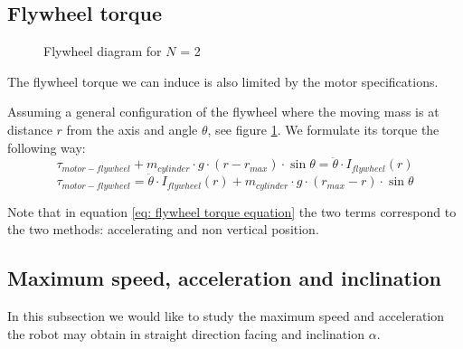 \subsection{Flywheel torque}
\begin{figure}
	\centering
            \caption{Flywheel diagram for $N$ = 2}
	\label{fig:Flywheel force diagram}
\end{figure}

The flywheel torque we can induce is also limited by the motor specifications. 

Assuming a general configuration of the flywheel where the moving mass is at distance $r$ from the axis and angle $\theta$, see figure \ref{fig:Flywheel force diagram}. We formulate its torque the following way:
\[
    \tau_{motor-flywheel} + m_{cylinder} \cdot g \cdot (r - r_{max}) \cdot \sin{\theta} = \ddot{\theta}\cdot I_{flywheel}(r)  
\]
\begin{equation}\label{eq: flywheel torque equation}    
    \tau_{motor-flywheel} = \ddot{\theta}\cdot I_{flywheel}(r) + m_{cylinder} \cdot g \cdot (r_{max} - r) \cdot \sin{\theta}  
\end{equation}

Note that in equation \ref{eq: flywheel torque equation} the two terms correspond to the two methods: accelerating and non vertical position.

\subsection{Maximum speed, acceleration and inclination}
In this subsection we would like to study the maximum speed and acceleration the robot may obtain in straight direction facing and inclination $\alpha$.

